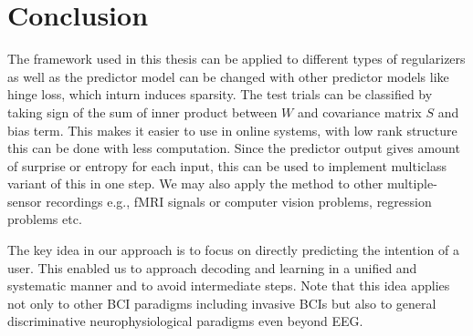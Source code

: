 \chapter{Conclusion}

The framework used in this thesis can be applied to different types of regularizers as well as the predictor model can be changed with other predictor models like hinge loss, which inturn induces sparsity. The test trials can be classified by taking sign of the sum of inner product between $W$ and covariance matrix $S$ and bias term. This makes it easier to use in online systems, with low rank structure this can be done with less computation. Since the predictor output gives amount of surprise or entropy for each input, this can be used to implement multiclass variant of this in one step. We may also apply the method to other multiple-sensor recordings e.g., fMRI signals or computer vision problems, regression problems etc.

The key idea in our approach is to focus on directly predicting the intention of a user. This enabled us to approach decoding and learning in a unified and systematic manner and to avoid intermediate steps. Note that this idea applies not only to other BCI paradigms including invasive BCIs but also to general discriminative neurophysiological paradigms even beyond EEG.
